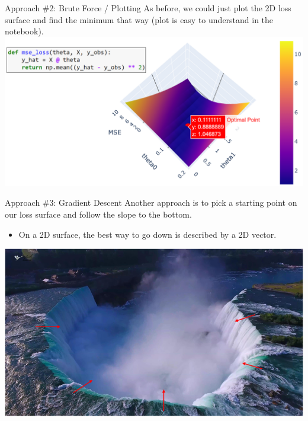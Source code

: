 \documentclass[aspectratio=169]{../latex_main/tntbeamer}  %
\begin{document}
	
	\begin{frame}{Approach \#2: Brute Force / Plotting}
	    As before, we could just plot the 2D loss surface and find the minimum that way (plot is easy to understand in the notebook). \\
	    \centering
	    \includegraphics[scale=.35]{Bild17}
	\end{frame}
	
	
	\begin{frame}{Approach \#3: Gradient Descent}
	    Another approach is to pick a starting point on our loss surface and follow the slope to the bottom.\\
	    \begin{itemize}
	        \item On a 2D surface, the best way to go down is described by a 2D vector.
	    \end{itemize}
	    \centering
	    \includegraphics[scale=.45]{Bild18}
	\end{frame}
	
\end{document}
